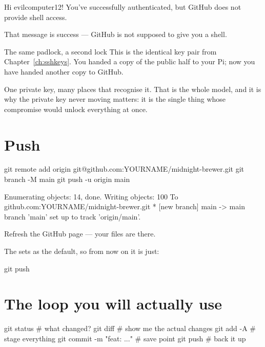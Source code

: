 \begin{trace}
Hi evilcomputer12! You've successfully authenticated,
but GitHub does not provide shell access.
\end{trace}

That message is success --- GitHub is not supposed to give you a shell.

\begin{concept}{The same padlock, a second lock}
This is the identical key pair from Chapter~\ref{ch:sshkeys}. You handed a copy
of the public half to your Pi; now you have handed another copy to GitHub.

One private key, many places that recognise it. That is the whole model, and it
is why the private key never moving matters: it is the single thing whose
compromise would unlock everything at once.
\end{concept}

\section{Push}

\begin{shell}
git remote add origin git@github.com:YOURNAME/midnight-brewer.git
git branch -M main
git push -u origin main
\end{shell}

\begin{trace}
Enumerating objects: 14, done.
Writing objects: 100%
To github.com:YOURNAME/midnight-brewer.git
 * [new branch]      main -> main
branch 'main' set up to track 'origin/main'.
\end{trace}

Refresh the GitHub page --- your files are there.

The  sets  as the default, so from now on it is just:

\begin{shell}
git push
\end{shell}

\section{The loop you will actually use}

\begin{shell}
git status                    # what changed?
git diff                      # show me the actual changes
git add -A                    # stage everything
git commit -m "feat: ..."     # save point
git push                      # back it up
\end{shell}

